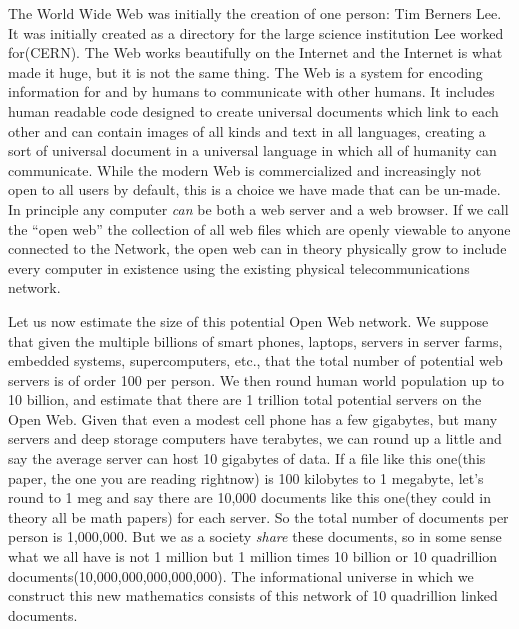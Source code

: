 The World Wide Web was initially the creation of one person: Tim Berners
Lee. It was initially created as a directory for the large science
institution Lee worked for(CERN). The Web works beautifully on the
Internet and the Internet is what made it huge, but it is not the same
thing. The Web is a system for encoding information for and by humans to
communicate with other humans. It includes human readable code designed
to create universal documents which link to each other and can contain
images of all kinds and text in all languages, creating a sort of
universal document in a universal language in which all of humanity can
communicate. While the modern Web is commercialized and increasingly not
open to all users by default, this is a choice we have made that can be
un-made. In principle any computer \emph{can} be both a web server and a
web browser. If we call the ``open web'' the collection of all web files
which are openly viewable to anyone connected to the Network, the open
web can in theory physically grow to include every computer in existence
using the existing physical telecommunications network.

Let us now estimate the size of this potential Open Web network. We
suppose that given the multiple billions of smart phones, laptops,
servers in server farms, embedded systems, supercomputers, etc., that
the total number of potential web servers is of order 100 per person. We
then round human world population up to 10 billion, and estimate that
there are 1 trillion total potential servers on the Open Web. Given that
even a modest cell phone has a few gigabytes, but many servers and deep
storage computers have terabytes, we can round up a little and say the
average server can host 10 gigabytes of data. If a file like this
one(this paper, the one you are reading rightnow) is 100 kilobytes to 1
megabyte, let's round to 1 meg and say there are 10,000 documents like
this one(they could in theory all be math papers) for each server. So
the total number of documents per person is 1,000,000. But we as a
society \emph{share} these documents, so in some sense what we all have
is not 1 million but 1 million times 10 billion or 10 quadrillion
documents(10,000,000,000,000,000). The informational universe in which
we construct this new mathematics consists of this network of 10
quadrillion linked documents.

